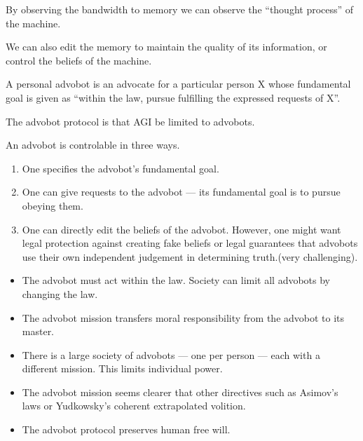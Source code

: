 {\vfill
By observing the bandwidth to memory we can observe the ``thought process'' of the machine.

\vfill
We can also edit the memory to maintain the quality of its information, or control the beliefs of the machine.


A personal advobot is an advocate for a particular person X whose fundamental goal is given as ``within the law, pursue fulfilling the expressed requests of X''.

\vfill
The advobot protocol is that AGI be limited to advobots.


An advobot is controlable in three ways.

\vfill
\begin{enumerate}
\item One specifies the advobot's fundamental goal.

\vfill
\item One can give requests to the advobot --- its fundamental goal is to pursue obeying them.

\vfill
\item One can directly edit the beliefs of the advobot.  However, one might want legal protection against creating fake beliefs or
legal guarantees that advobots use their own independent judgement in determining truth.(very challenging).
\end{enumerate}



\begin{itemize}
\item The advobot must act within the law. Society can limit all advobots by changing the law.

\vfill
\item The advobot mission transfers moral responsibility from the advobot to its master.

\vfill
\item There is a large society of advobots --- one per person --- each with a different mission.  This limits individual power.

\vfill
\item The advobot mission seems clearer that other directives such as Asimov’s laws or Yudkowsky's coherent extrapolated volition.

\vfill
\item The advobot protocol preserves human free will.
\end{itemize}

}
